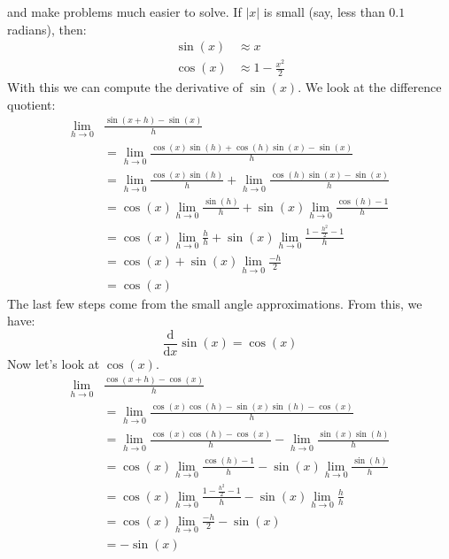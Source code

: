 \documentclass{article}
\theoremstyle{normal}
\theoremstyle{plain}
\begin{document}
    and make problems much easier to solve. If $|x|$ is small (say, less than
    $0.1$ radians), then:
    \begin{align}
        \sin(x)&\approx{x}\\
        \cos(x)&\approx{1}-\frac{x^{2}}{2}
    \end{align}
    With this we can compute the derivative of $\sin(x)$. We look at the
    difference quotient:
    \begin{align}
        \lim_{h\rightarrow{0}}&
            \frac{\sin(x+h)-\sin(x)}{h}\nonumber\\
        &=\lim_{h\rightarrow{0}}
            \frac{\cos(x)\sin(h)+\cos(h)\sin(x)-\sin(x)}{h}\\
        &=\lim_{h\rightarrow{0}}\frac{\cos(x)\sin(h)}{h}
            +\lim_{h\rightarrow{0}}\frac{\cos(h)\sin(x)-\sin(x)}{h}\\
        &=\cos(x)\lim_{h\rightarrow{0}}\frac{\sin(h)}{h}+
            \sin(x)\lim_{h\rightarrow{0}}\frac{\cos(h)-1}{h}\\
        &=\cos(x)\lim_{h\rightarrow{0}}\frac{h}{h}
            +\sin(x)\lim_{h\rightarrow{0}}\frac{1-\frac{h^{2}}{2}-1}{h}\\
        &=\cos(x)+\sin(x)\lim_{h\rightarrow{0}}\frac{-h}{2}\\
        &=\cos(x)
    \end{align}
    The last few steps come from the small angle approximations. From this, we
    have:
    \begin{equation}
        \frac{\text{d}}{\text{d}x}\sin(x)=\cos(x)
    \end{equation}
    Now let's look at $\cos(x)$.
    \begin{align}
        \lim_{h\rightarrow{0}}&
            \frac{\cos(x+h)-\cos(x)}{h}\\
        &=\lim_{h\rightarrow{0}}
            \frac{\cos(x)\cos(h)-\sin(x)\sin(h)-\cos(x)}{h}\\
        &=\lim_{h\rightarrow{0}}\frac{\cos(x)\cos(h)-\cos(x)}{h}
            -\lim_{h\rightarrow{0}}\frac{\sin(x)\sin(h)}{h}\\
        &=\cos(x)\lim_{h\rightarrow{0}}\frac{\cos(h)-1}{h}
            -\sin(x)\lim_{h\rightarrow{0}}\frac{\sin(h)}{h}\\
        &=\cos(x)\lim_{h\rightarrow{0}}\frac{1-\frac{h^{2}}{2}-1}{h}
            -\sin(x)\lim_{h\rightarrow{0}}\frac{h}{h}\\
        &=\cos(x)\lim_{h\rightarrow{0}}\frac{-h}{2}-\sin(x)\\
        &=-\sin(x)
    \end{align}
\end{document}
